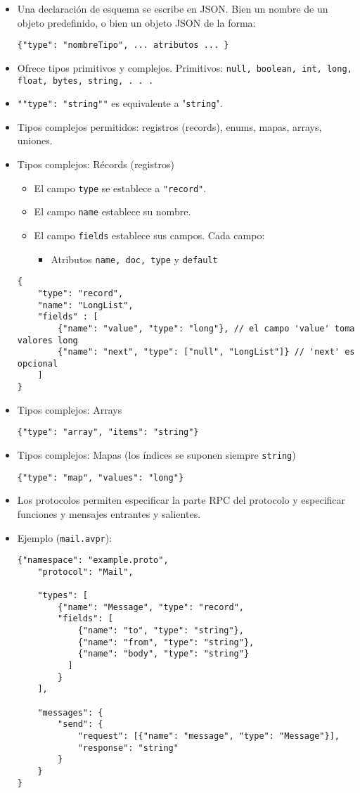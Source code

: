 \begin{itemize}
	\item Una declaración de esquema se escribe en JSON. Bien un nombre de un objeto predefinido, o bien un objeto JSON de la forma:
	\begin{lstlisting}
{"type": "nombreTipo", ... atributos ... }
	\end{lstlisting}
	\item Ofrece tipos primitivos y complejos. Primitivos: \texttt{null, boolean, int, long, float, bytes, string, . . .}
	\item \texttt{"{"type": "string"}"} es equivalente a "\texttt{string}".
	\item Tipos complejos permitidos: registros (records), enums, mapas, arrays, uniones.
	\item Tipos complejos: Récords (registros)
	\begin{itemize}
		\item El campo \texttt{type} se establece a \texttt{"record"}.
		\item El campo \texttt{name} establece su nombre.
		\item El campo \texttt{fields} establece sus campos. Cada campo:
		\begin{itemize}[label=$\to$]
			\item Atributos \texttt{name, doc, type} y \texttt{default}
		\end{itemize}
	\end{itemize}
	
\pagebreak
\begin{lstlisting}
{
	"type": "record",
	"name": "LongList",
	"fields" : [
		{"name": "value", "type": "long"}, // el campo 'value' toma valores long
		{"name": "next", "type": ["null", "LongList"]} // 'next' es opcional
	]
}
\end{lstlisting}

	\item Tipos complejos: Arrays
	\begin{lstlisting}
{"type": "array", "items": "string"}
	\end{lstlisting}
	\item Tipos complejos: Mapas (los índices se suponen siempre \texttt{string})

\begin{lstlisting}
{"type": "map", "values": "long"}
\end{lstlisting}
\item Los protocolos permiten especificar la parte RPC del protocolo y especificar funciones y mensajes entrantes y salientes.
\item Ejemplo (\texttt{mail.avpr}):
\begin{lstlisting}
{"namespace": "example.proto",
	"protocol": "Mail",

	"types": [
		{"name": "Message", "type": "record",
		"fields": [
			{"name": "to", "type": "string"},
			{"name": "from", "type": "string"},
			{"name": "body", "type": "string"}
		  ]
		}
	],

	"messages": {
		"send": {
			"request": [{"name": "message", "type": "Message"}],
			"response": "string"
		}
	}
}
\end{lstlisting}
\end{itemize}
